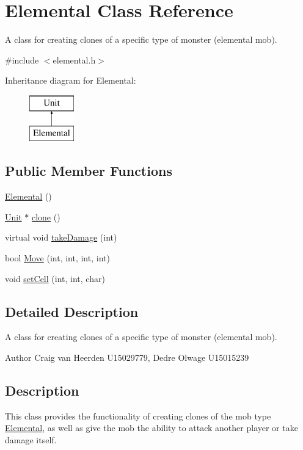 \hypertarget{class_elemental}{\section{\-Elemental \-Class \-Reference}
\label{class_elemental}
}


\-A class for creating clones of a specific type of monster (elemental mob).  




{\ttfamily \#include $<$elemental.\-h$>$}

\-Inheritance diagram for \-Elemental\-:\begin{figure}[H]
\begin{center}
\leavevmode
\includegraphics[height=2.000000cm]{class_elemental}
\end{center}
\end{figure}
\subsection*{\-Public \-Member \-Functions}
\begin{DoxyCompactItemize}
\item 
\hyperlink{class_elemental_ab1c090ccbb2ac64d7cd65dbef999d9fb}{\-Elemental} ()
\item 
\hyperlink{class_unit}{\-Unit} $\ast$ \hyperlink{class_elemental_a8cfdf738ed7b5afb1e2f7c2fa3cdc717}{clone} ()
\item 
virtual void \hyperlink{class_elemental_a4fa7dc765efa64467ed460aad8c38459}{take\-Damage} (int)
\item 
bool \hyperlink{class_elemental_a5364d9096f513a1adb080b06741dadbb}{\-Move} (int, int, int, int)
\item 
void \hyperlink{class_elemental_a56083e462fc7ef72e876dcb91f7ed13e}{set\-Cell} (int, int, char)
\end{DoxyCompactItemize}


\subsection{\-Detailed \-Description}
\-A class for creating clones of a specific type of monster (elemental mob). 

\begin{DoxyAuthor}{\-Author}
\-Craig van \-Heerden \-U15029779, \-Dedre \-Olwage \-U15015239
\end{DoxyAuthor}
\hypertarget{class_unit_factory_Description}{}\subsection{\-Description}\label{class_unit_factory_Description}
\-This class provides the functionality of creating clones of the mob type \hyperlink{class_elemental}{\-Elemental}, as well as give the mob the ability to attack another player or take damage itself. 

